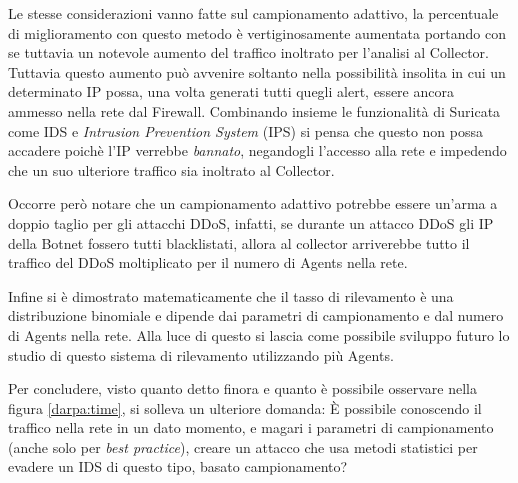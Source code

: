 \documentclass[12pt,a4paper,openright,twoside]{report}
\renewcommand{\chaptermark}[1]{\markboth{\thechapter.\ #1}{}}
\begin{document}
Le stesse considerazioni vanno fatte sul campionamento adattivo, la percentuale di miglioramento
con questo metodo \`e vertiginosamente aumentata portando con se tuttavia un notevole aumento
del traffico inoltrato per l'analisi al Collector. Tuttavia questo aumento pu\`o avvenire
soltanto nella possibilit\`a insolita in cui un determinato IP possa, una volta generati tutti
quegli alert, essere ancora ammesso nella rete dal Firewall. Combinando insieme le
funzionalit\`a di Suricata come IDS e {\it Intrusion Prevention System} (IPS) si pensa
che questo non possa accadere poich\`e l'IP verrebbe {\it bannato}, negandogli l'accesso alla rete
e impedendo che un suo ulteriore traffico sia inoltrato al Collector.

Occorre per\`o notare che un campionamento adattivo potrebbe essere un'arma a doppio taglio per
gli attacchi DDoS, infatti, se durante un attacco DDoS gli IP della Botnet fossero tutti blacklistati,
allora al collector arriverebbe tutto il traffico del DDoS moltiplicato per il numero di Agents nella rete.

Infine si \`e dimostrato matematicamente che il tasso di rilevamento \`e una
distribuzione binomiale e dipende dai parametri di campionamento e dal numero di Agents nella
rete.
Alla luce di questo si lascia come possibile sviluppo futuro lo studio di questo
sistema di rilevamento utilizzando pi\`u Agents.

Per concludere, visto quanto detto finora e quanto \`e possibile osservare nella figura \ref{darpa:time},
si solleva un ulteriore domanda: \`E possibile conoscendo il traffico nella rete in un dato momento, e magari
i parametri di campionamento (anche solo per {\it best practice}), creare un
attacco che usa metodi statistici per evadere un IDS di questo tipo, basato campionamento?

\renewcommand{\chaptermark}[1]{\markright{\thechapter \ #1}{}}
\lhead[\fancyplain{}{\bfseries\thepage}]{\fancyplain{}{\bfseries\rightmark}}
\appendix                               %
\end{document}
